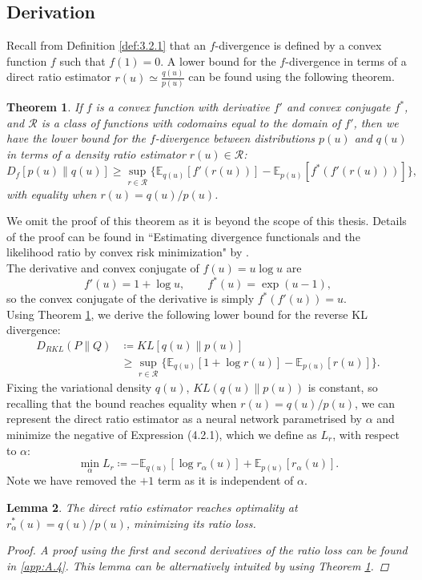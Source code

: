 \documentclass[honours,12pt]{unswthesis}
\newcommand{\E}{\mathbb{E}}
\newtheorem{theorem}{Theorem}[section]
\newtheorem{lemma}[theorem]{Lemma}
\numberwithin{equation}{section}
\theoremstyle{definition}
\begin{document}
\subsection{Derivation}\label{sec:4.2.1}
Recall from Definition \ref{def:3.2.1} that an $f$-divergence is defined by a convex function $f$ such that $f(1)=0$. A lower bound for the $f$-divergence in terms of a direct ratio estimator $r(u)\simeq \frac{q(u)}{p(u)}$ can be found using the following theorem.
\begin{theorem}\label{4.2.1}  \citep{nguyen}
If $f$ is a convex function with derivative $f'$ and convex conjugate $f^*$, and $\mathcal{R}$ is a class of functions with codomains equal to the domain of $f'$, then we have the lower bound for the $f$-divergence between distributions $p(u)$ and $q(u)$ in terms of a density ratio estimator $r(u)\in \mathcal{R}$:
\[D_f [p(u)\|q(u)]\geq \sup_{r\in \mathcal{R}} \{\mathbb{E}_{q(u)}[f'(r(u))]-\mathbb{E}_{p(u)}[f^*(f'(r(u)))]\},\]
with equality when $r(u)=q(u)/p(u)$.
\end{theorem}
We omit the proof of this theorem as it is beyond the scope of this thesis. Details of the proof can be found in ``Estimating divergence functionals and the likelihood ratio by convex risk minimization" by \citet{nguyen}.\\
The derivative and convex conjugate of $f(u)=u\log u$ are
\[f'(u)=1+\log u, \qquad f^*(u)=\exp(u-1),\]
so the convex conjugate of the derivative is simply $f^*(f'(u))=u$.\\
Using Theorem \ref{4.2.1}, we derive the following lower bound for the reverse KL divergence:
\begin{align}
D_{RKL}(P\|Q)&\coloneqq KL[q(u)\|p(u)]\nonumber\\
&\geq \sup_{r\in \mathcal{R}}\{\mathbb{E}_{q(u)}[1+\log r(u)]-\mathbb{E}_{p(u)}[r(u)]\}.
\end{align}
Fixing the variational density $q(u)$, $KL(q(u)\|p(u))$ is constant, so recalling that the bound reaches equality when $r(u)=q(u)/p(u)$, we can represent the direct ratio estimator as a neural network parametrised by $\alpha$ and minimize the negative of Expression (4.2.1), which we define as $L_r$, with respect to $\alpha$:
\begin{equation}
\min_\alpha L_r\coloneqq-\E_{q(u)}[\log r_\alpha(u)]+\E_{p(u)}[r_\alpha(u)].
\end{equation}
Note we have removed the $+1$ term as it is independent of $\alpha$.
\begin{lemma}
The direct ratio estimator reaches optimality at $r^*_\alpha(u)=q(u)/p(u)$, minimizing its ratio loss.
\begin{proof}
A proof using the first and second derivatives of the ratio loss can be found in \autoref{app:A.4}. This lemma can be alternatively intuited by using Theorem \ref{4.2.1}.
\end{proof}
\end{lemma}
\end{document}
